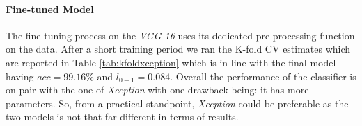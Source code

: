 \paragraph{Fine-tuned Model}
The fine tuning process on the \textit{VGG-16} uses its dedicated
pre-processing function on the data. After a short training period
we ran the K-fold CV estimates which are reported in Table \ref{tab:kfoldxception} which is in line
with the final model having $acc=99.16\%$ and $l_{0-1}=0.084$.
Overall the performance of the classifier is on pair with the one of \textit{Xception}
with one drawback being: it has more parameters. So, from a practical standpoint,
\textit{Xception} could be preferable as the two models is not that far different in terms of results.